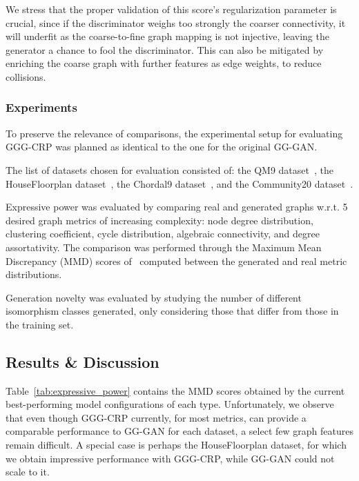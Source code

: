 We stress that the proper validation of this score's regularization parameter is crucial, since if the discriminator weighs too strongly the coarser connectivity, it will underfit as the coarse-to-fine graph mapping is not injective, leaving the generator a chance to fool the discriminator. This can also be mitigated by enriching the coarse graph with further features as edge weights, to reduce collisions.

\subsubsection{Experiments}

To preserve the relevance of comparisons, the experimental setup for evaluating GGG-CRP was planned as identical to the one for the original GG-GAN.

The list of datasets chosen for evaluation consisted of: the QM9 dataset~\cite{de_cao_molgan_2018}, the HouseFloorplan dataset~\cite{nauata_house-gan_2020}, the Chordal9 dataset~\cite{mckay_chordal_2020}, and the Community20 dataset~\cite{niu_permutation_2020}.

Expressive power was evaluated by comparing real and generated graphs w.r.t. 5 desired graph metrics of increasing complexity: node degree distribution, clustering coefficient, cycle distribution, algebraic connectivity, and degree assortativity. The comparison was performed through the Maximum Mean Discrepancy (MMD) scores of~\cite{you_graphrnn_2018} computed between the generated and real metric distributions.

Generation novelty was evaluated by studying the number of different isomorphism classes generated, only considering those that differ from those in the training set.

\subsection{Results \& Discussion}
\label{sec:results_gggcrp}

Table~\ref{tab:expressive_power} contains the MMD scores obtained by the current best-performing model configurations of each type. Unfortunately, we observe that even though GGG-CRP currently, for most metrics, can provide a comparable performance to GG-GAN for each dataset, a select few graph features remain difficult. A special case is perhaps the HouseFloorplan dataset, for which we obtain impressive performance with GGG-CRP, while GG-GAN could not scale to it.

